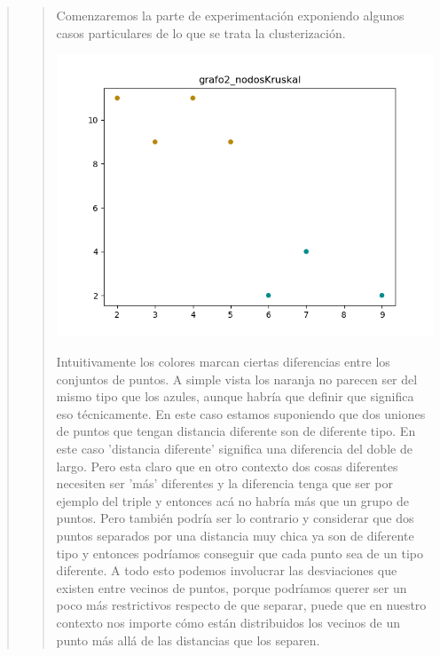 \documentclass[11pt,a4paper]{article}
\begin{document}
\begin{verse}
\begin{verse}
Comenzaremos la parte de experimentación exponiendo algunos casos particulares de lo que se trata la clusterización.
\begin{center}
\includegraphics[scale=.8]{graficos/grafo2_nodosKruskal.png}
\end{center}
Intuitivamente los colores marcan ciertas diferencias entre los conjuntos de puntos. A simple vista los  naranja no parecen ser del mismo tipo que los azules, aunque habría que definir que significa eso técnicamente. En este caso estamos suponiendo que dos uniones de puntos que tengan distancia diferente son de diferente tipo. En este caso 'distancia diferente' significa una diferencia del doble de largo. Pero esta claro que en otro contexto dos cosas diferentes necesiten ser 'más' diferentes y la diferencia tenga que ser por ejemplo del triple y entonces acá no habría más que un grupo de puntos. Pero también podría ser lo contrario y considerar que dos puntos separados por una distancia muy chica ya son de diferente tipo y entonces podríamos conseguir que cada punto sea de un tipo diferente. A todo esto podemos involucrar las desviaciones que existen entre vecinos de puntos, porque podríamos querer ser un poco más restrictivos respecto de que separar, puede que en nuestro contexto nos importe cómo están distribuidos los vecinos de un punto más allá de las distancias que los separen. 
\begin{center}

\end{center}
\end{verse}
\end{verse}
\end{document}

